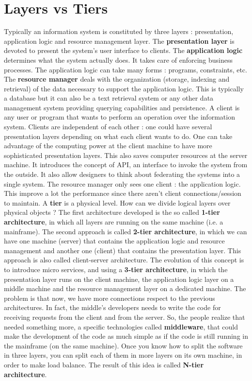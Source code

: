 \section{Layers vs Tiers}
Typically an information system is constituted by three layers : presentation, application logic and resource management layer. The \textbf{presentation layer} is devoted to present the system's user interface to clients. The \textbf{application logic} determines what the system actually does. It takes care of enforcing business processes. The application logic can take many forms : programs, constraints, etc. The \textbf{resource manager} deals with the organization (storage, indexing and retrieval) of the data necessary to support the application logic. This is typically a database but it can also be a text retrieval system or any other data management system providing querying capabilities and persistence. A client is any user or program that wants to perform an operation over the information system. Clients are independent of each other : one could have several presentation layers depending on what each client wants to do. One can take advantage of the computing power at the client machine to have more sophisticated presentation layers. This also saves computer resources at the server machine. It introduces the concept of API, an interface to invoke the system from the outside. It also allow designers to think about federating the systems into a single system. The resource manager only sees one client : the application logic. This improve a lot the performance since there aren't client connections/session to maintain. A \textbf{tier} is a physical level. How can we divide logical layers over physical objects ? The first architecture developed is the so called \textbf{1-tier architecture}, in which all layers are running on the same machine (i.e. a mainframe). The second approach is called \textbf{2-tier architecture}, in which we can have one machine (server) that contains the application logic and resource management and another one (client) that contains the presentation layer. This approach is also called client-server architecture. The evolution of this concept is to introduce micro services, and using a \textbf{3-tier architecture}, in which the presentation layer runs on the client machine, the application logic layer on a middle machine and the resource management layer on a dedicated machine. The problem is that now, we have more connections respect to the previous architectures. In fact, the middle's developers needs to write the code for  receiving requests from the client and from the server. So, the people realize that needed something more, a specific technologies called \textbf{middleware}, that could make the development of the code as much simple as if the code is still running in the mainframe (on the same machine). Once you know how to split the software in three layers, you can split each of them in more layers on its own machine, in order to make load balance. The result of this idea is called \textbf{N-tier architecture}.
